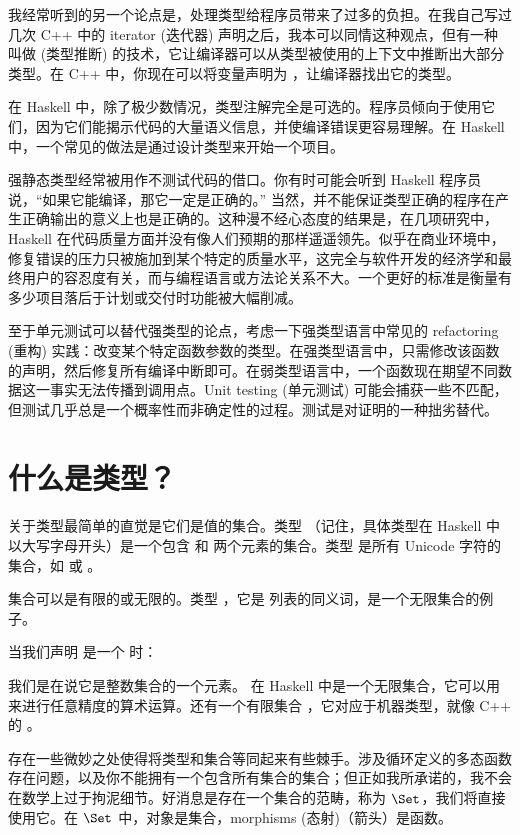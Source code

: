 我经常听到的另一个论点是，处理类型给程序员带来了过多的负担。在我自己写过几次 C++ 中的 iterator (迭代器) 声明之后，我本可以同情这种观点，但有一种叫做  (类型推断) 的技术，它让编译器可以从类型被使用的上下文中推断出大部分类型。在 C++ 中，你现在可以将变量声明为 ，让编译器找出它的类型。

在 Haskell 中，除了极少数情况，类型注解完全是可选的。程序员倾向于使用它们，因为它们能揭示代码的大量语义信息，并使编译错误更容易理解。在 Haskell 中，一个常见的做法是通过设计类型来开始一个项目。

强静态类型经常被用作不测试代码的借口。你有时可能会听到 Haskell 程序员说，“如果它能编译，那它一定是正确的。” 当然，并不能保证类型正确的程序在产生正确输出的意义上也是正确的。这种漫不经心态度的结果是，在几项研究中，Haskell 在代码质量方面并没有像人们预期的那样遥遥领先。似乎在商业环境中，修复错误的压力只被施加到某个特定的质量水平，这完全与软件开发的经济学和最终用户的容忍度有关，而与编程语言或方法论关系不大。一个更好的标准是衡量有多少项目落后于计划或交付时功能被大幅削减。

至于单元测试可以替代强类型的论点，考虑一下强类型语言中常见的 refactoring (重构) 实践：改变某个特定函数参数的类型。在强类型语言中，只需修改该函数的声明，然后修复所有编译中断即可。在弱类型语言中，一个函数现在期望不同数据这一事实无法传播到调用点。Unit testing (单元测试) 可能会捕获一些不匹配，但测试几乎总是一个概率性而非确定性的过程。测试是对证明的一种拙劣替代。

\section{什么是类型？}

关于类型最简单的直觉是它们是值的集合。类型 （记住，具体类型在 Haskell 中以大写字母开头）是一个包含  和  两个元素的集合。类型  是所有 Unicode 字符的集合，如  或 。

集合可以是有限的或无限的。类型 ，它是  列表的同义词，是一个无限集合的例子。

当我们声明  是一个  时：

我们是在说它是整数集合的一个元素。 在 Haskell 中是一个无限集合，它可以用来进行任意精度的算术运算。还有一个有限集合 ，它对应于机器类型，就像 C++ 的 。

存在一些微妙之处使得将类型和集合等同起来有些棘手。涉及循环定义的多态函数存在问题，以及你不能拥有一个包含所有集合的集合；但正如我所承诺的，我不会在数学上过于拘泥细节。好消息是存在一个集合的范畴，称为 $\Set$，我们将直接使用它。在 $\Set$ 中，对象是集合，morphisms (态射)（箭头）是函数。

